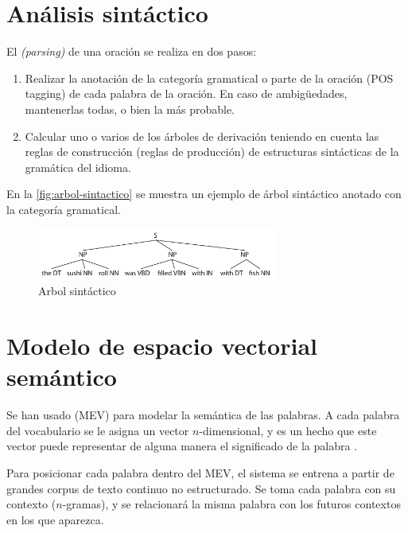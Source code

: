 \section{Análisis sintáctico}

El  \emph{(parsing)} de una oración se realiza en dos pasos:
\begin{enumerate}
\item Realizar la anotación de la categoría gramatical o parte de la oración (POS tagging) de cada palabra de la oración. En caso de ambigüedades, mantenerlas todas, o bien la más probable.
\item Calcular uno o varios de los árboles de derivación teniendo en cuenta las reglas de construcción (reglas de producción) de estructuras sintácticas de la gramática del idioma.
\end{enumerate}

En la \autoref{fig:arbol-sintactico} se muestra un ejemplo de árbol sintáctico anotado con la categoría gramatical.

\begin{figure}[htbp]
\centering
\includegraphics[width=0.7\textwidth]{arbol-sintactico}
\caption{Arbol sintáctico}
\label{fig:arbol-sintactico}
\end{figure}

\section{Modelo de espacio vectorial semántico}\label{sec:MEVS}

Se han usado  (MEV) para modelar la semántica de las palabras. A cada palabra del vocabulario se le asigna un vector $n$-dimensional, y es un hecho que este vector puede representar de alguna manera el significado de la palabra \citep{Socher2012}.

Para posicionar cada palabra dentro del MEV, el sistema se entrena a partir de grandes corpus de texto continuo no estructurado. Se toma cada palabra con su contexto ($n$-gramas), y se relacionará la misma palabra con los futuros contextos en los que aparezca.

